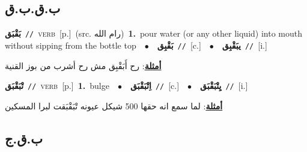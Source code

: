 \documentclass[10pt,a4paper,twoside]{article} %
\begin{document}
\begin{multicols}{2}
\vspace{-3mm}
\subsection*{\color{blue}\foreignlanguage{arabic}{ب.ق.ب.ق}\color{blue}{}} 

{\setlength\topsep{0pt}\textbf{\foreignlanguage{arabic}{بَقْبَق}}\ {\color{gray}\texttt{//}\color{black}}\ \textsc{verb}\ [p.]\ (src. \color{gray}\foreignlanguage{arabic}{رام الله}\color{black})\ \textbf{1.}~pour water (or any other liquid) into mouth without sipping from the bottle top\ \ $\bullet$\ \ \setlength\topsep{0pt}\textbf{\foreignlanguage{arabic}{بَقْبِق}}\ {\color{gray}\texttt{//}\color{black}}\ [c.]\ \ $\bullet$\ \ \setlength\topsep{0pt}\textbf{\foreignlanguage{arabic}{يبَقْبِق}}\ {\color{gray}\texttt{//}\color{black}}\ [i.]\  \begin{flushright}\color{gray}\foreignlanguage{arabic}{\textbf{\underline{\foreignlanguage{arabic}{أمثلة}}}: رح أَبَقْبِق مش رح أشرب من بوز القنية}\end{flushright}\color{black}} \vspace{2mm}

{\setlength\topsep{0pt}\textbf{\foreignlanguage{arabic}{تْبَقْبَق}}\ {\color{gray}\texttt{//}\color{black}}\ \textsc{verb}\ [p.]\ \textbf{1.}~bulge\ \ $\bullet$\ \ \setlength\topsep{0pt}\textbf{\foreignlanguage{arabic}{اِتْبَقْبَق}}\ {\color{gray}\texttt{//}\color{black}}\ [c.]\ \ $\bullet$\ \ \setlength\topsep{0pt}\textbf{\foreignlanguage{arabic}{يِتْبَقْبَق}}\ {\color{gray}\texttt{//}\color{black}}\ [i.]\  \begin{flushright}\color{gray}\foreignlanguage{arabic}{\textbf{\underline{\foreignlanguage{arabic}{أمثلة}}}: لما سمع انه حقها 500 شيكل عيونه تْبَقْبَقت لبرا المسكين}\end{flushright}\color{black}} \vspace{2mm}

\vspace{-3mm}
\subsection*{\color{blue}\foreignlanguage{arabic}{ب.ق.ج}\color{blue}{}} 


\end{multicols}
\end{document}
